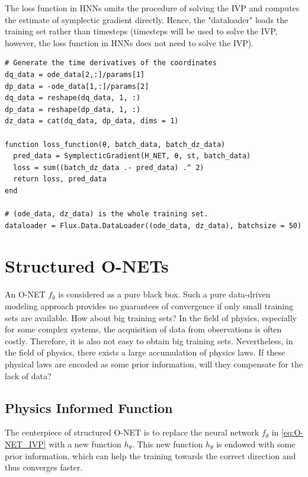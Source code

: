 \documentclass[
	parskip, 			   %
	twoside, 			   %
	DIV=14, 			   %
	BCOR=15.0mm, 		   %
	headsepline, 		   %
	open=right, 		   %
	captions=tableheading, %
	bibliography=totoc,    %
	numbers=noenddot       %
]{scrreprt}
\begin{document}
The loss function in HNNs omits the procedure of solving the IVP and computes the estimate of symplectic gradient directly. Hence, the "dataloader" loads the training set rather than timesteps (timesteps will be used to solve the IVP, however, the loss function in HNNs does not need to solve the IVP).

\begin{verbatim}
# Generate the time derivatives of the coordinates
dq_data = ode_data[2,:]/params[1]
dp_data = -ode_data[1,:]/params[2]
dq_data = reshape(dq_data, 1, :)
dp_data = reshape(dp_data, 1, :)
dz_data = cat(dq_data, dp_data, dims = 1)

function loss_function(θ, batch_data, batch_dz_data)
  pred_data = SymplecticGradient(H_NET, θ, st, batch_data)
  loss = sum((batch_dz_data .- pred_data) .^ 2)
  return loss, pred_data
end

# (ode_data, dz_data) is the whole training set.
dataloader = Flux.Data.DataLoader((ode_data, dz_data), batchsize = 50)
\end{verbatim}

\section{Structured O-NETs}
An O-NET $f_{\theta}$ is considered as a pure black box. Such a pure data-driven modeling approach provides no guarantees of convergence if only small training sets are available. How about big training sets? In the field of physics, especially for some complex systems, the acquisition of data from observations is often costly. Therefore, it is also not easy to obtain big training sets. Nevertheless, in the field of physics, there exists a large accumulation of physics laws. If these physical laws are encoded as some prior information, will they compensate for the lack of data?

\subsection{Physics Informed Function}

The centerpiece of structured O-NET is to replace the neural network $f_{\theta}$ in \ref{eq:O-NET_IVP} with a new function $h_{\theta}$. This new function $h_{\theta}$ is endowed with some prior information, which can help the training towards the correct direction and thus converges faster.
\end{document}
